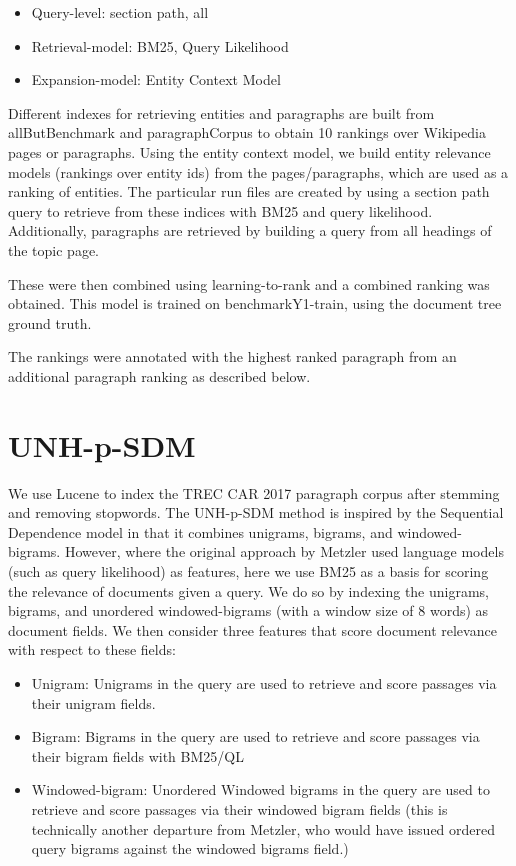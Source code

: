 \documentclass{article}
\begin{document}
\begin{itemize}
   \item Query-level: section path, all
    \item Retrieval-model: BM25, Query Likelihood
    \item Expansion-model: Entity Context Model
\end{itemize}

Different indexes for retrieving entities and paragraphs are built from allButBenchmark and paragraphCorpus to obtain 10 rankings over Wikipedia pages or paragraphs. Using the entity context model, we build entity relevance models (rankings over entity ids) from the pages/paragraphs, which are used as a ranking of entities. The particular run files are created by using a section path query to retrieve from these indices with BM25 and query likelihood. Additionally, paragraphs are retrieved by building a query from all headings of the topic page.

These were then combined using  learning-to-rank and a combined ranking was obtained. 
This model is trained on benchmarkY1-train, using the document tree ground truth.

The rankings were annotated with the highest ranked paragraph from an additional paragraph ranking as described below.


\section{UNH-p-SDM}\label{sec:sdm}

We use Lucene to index the TREC CAR 2017 paragraph corpus after stemming and removing stopwords.
The UNH-p-SDM method is inspired by the Sequential Dependence model \cite{metzler2005markov} in that it combines unigrams, bigrams, and windowed-bigrams. However, where the original approach by Metzler used language models (such as query likelihood) as features, here we use BM25 as a basis for scoring the relevance of documents given a query. We do so by indexing the unigrams, bigrams, and unordered windowed-bigrams (with a window size of 8 words) as document fields. We then consider three features that score document relevance with respect to these fields:
 
 \begin{itemize}
     \item Unigram: Unigrams in the query are used to retrieve and score passages via their unigram fields.
     \item Bigram: Bigrams in the query are used to retrieve and score passages via their bigram fields with BM25/QL
     \item Windowed-bigram: Unordered Windowed bigrams in the query are used to retrieve and score passages via their windowed bigram fields (this is technically another departure from Metzler, who would have issued ordered query bigrams against the windowed bigrams field.)
 \end{itemize}
 
\end{document}

